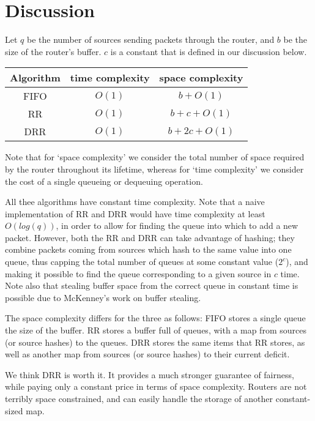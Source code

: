 
\section{Discussion}

Let $q$ be the number of sources sending packets through the router, and $b$ be the size of the router's buffer.
$c$ is a constant that is defined in our discussion below.

\begin{center}
\begin{tabular}{|c|c|c|}
\hline
Algorithm & time complexity & space complexity \\ \hline \hline
FIFO & $O(1)$ & $b + O(1)$ \\ \hline
RR & $O(1)$ & $b + c + O(1)$ \\ \hline
DRR & $O(1)$ & $b + 2c + O(1)$ \\ \hline
\end{tabular}
\end{center}

Note that for `space complexity' we consider the total number of space required by the router throughout its lifetime, whereas for `time complexity' we consider the cost of a single queueing or dequeuing operation. 

All thee algorithms have constant time complexity.
Note that a naive implementation of RR and DRR would have time complexity at least $O(log(q))$, in order to allow for finding the queue into which to add a new packet.
However, both the RR and DRR can take advantage of hashing; they combine packets coming from sources which hash to the same value into one queue, thus capping the total number of queues at some constant value ($2^c$), and making it possible to find the queue corresponding to a given source in $c$ time.
Note also that stealing buffer space from the correct queue in constant time is possible due to McKenney's work on buffer stealing.

The space complexity differs for the three as follows: 
FIFO stores a single queue the size of the buffer.
RR stores a buffer full of queues, with a map from sources (or source hashes) to the queues.
DRR stores the same items that RR stores, as well as another map from sources (or source hashes) to their current deficit.

We think DRR is worth it. 
It provides a much stronger guarantee of fairness, 
while paying only a constant price in terms of space complexity. 
Routers are not terribly space constrained, and can easily handle the storage of another constant-sized map.

